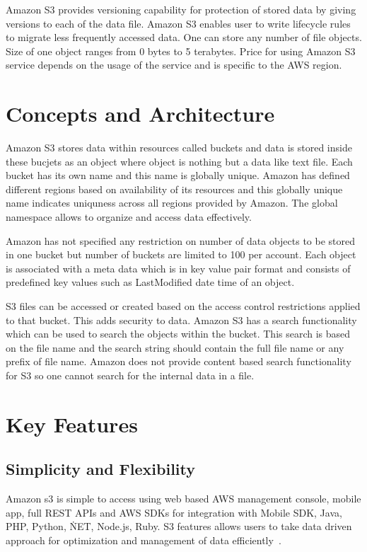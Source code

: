 Amazon S3 provides versioning capability for protection of stored data by giving
versions to each of the data file. Amazon S3 enables user to write lifecycle
rules to migrate less frequently accessed data. One can store any number of file
objects. Size of one object ranges from 0 bytes to 5 terabytes. Price for using
Amazon S3 service depends on the usage of the service and is specific to the AWS
region.



\section{Concepts and Architecture}


Amazon S3 stores data within resources called buckets and data is stored inside
these bucjets as an object where object is nothing but a data like text file.
Each bucket has its own name and this name is globally unique. Amazon has
defined different regions based on availability of its resources and this
globally unique name indicates uniquness across all regions provided by Amazon.
The global namespace allows to organize and access data effectively.

Amazon has not specified any restriction on number of data objects to be stored
in one bucket but number of buckets are limited to 100 per account. Each object
is associated with a meta data which is in key value pair format and consists of
predefined key values such as LastModified date time of an object.

S3 files can be accessed or created based on the access control restrictions
applied to that bucket. This adds security to data. Amazon S3 has a search
functionality which can be used to search the objects within the bucket. This
search is based on the file name and the search string should contain the full
file name or any prefix of file name. Amazon does not provide content based
search functionality for S3 so one cannot search for the internal data in a
file.




\section{Key Features}


\subsection{Simplicity and Flexibility} 

Amazon s3 is simple to access using web based AWS management console,
mobile app, full REST APIs and AWS SDKs for integration with Mobile
SDK, Java, PHP, Python, \.NET, Node.js, Ruby. S3 features allows users
to take data driven approach for optimization and management of data
efficiently~\cite{hid-sp18-420-amazon-S3-FAQ}.


